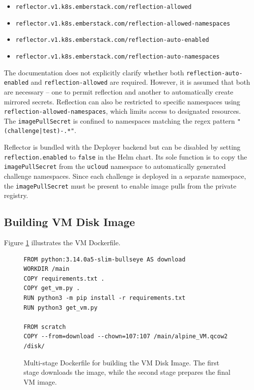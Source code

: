 \begin{itemize}
    \item \texttt{reflector.v1.k8s.emberstack.com/reflection-allowed}
    \item \texttt{reflector.v1.k8s.emberstack.com/reflection-allowed-namespaces}
    \item \texttt{reflector.v1.k8s.emberstack.com/reflection-auto-enabled}
    \item \texttt{reflector.v1.k8s.emberstack.com/reflection-auto-namespaces}
\end{itemize}

The documentation does not explicitly clarify whether both \texttt{reflection-auto\allowbreak -enabled} and \texttt{reflection-allowed} are required. However, it is assumed that both are necessary -- one to permit reflection and another to automatically create mirrored secrets. Reflection can also be restricted to specific namespaces using \texttt{reflection-allowed-namespaces}, which limits access to designated resources. The \texttt{imagePullSecret} is confined to namespaces matching the regex pattern \texttt{"(challenge|test)-.*"}.

Reflector is bundled with the Deployer backend but can be disabled by setting \texttt{reflection.enabled} to \texttt{false} in the Helm chart. Its sole function is to copy the \texttt{imagePullSecret} from the \texttt{ucloud} namespace to automatically generated challenge namespaces. Since each challenge is deployed in a separate namespace, the \texttt{imagePullSecret} must be present to enable image pulls from the private registry.

\subsection{Building VM Disk Image}
Figure \ref{fig:dockerfile_vm_image} illustrates the VM Dockerfile.

\begin{figure}[h]
    \centering
\begin{verbatim}
FROM python:3.14.0a5-slim-bullseye AS download
WORKDIR /main
COPY requirements.txt .
COPY get_vm.py .
RUN python3 -m pip install -r requirements.txt
RUN python3 get_vm.py

FROM scratch
COPY --from=download --chown=107:107 /main/alpine_VM.qcow2 /disk/
\end{verbatim}
    \caption{Multi-stage Dockerfile for building the VM Disk Image. The first stage downloads the image, while the second stage prepares the final VM image.}
    \label{fig:dockerfile_vm_image}
\end{figure}

